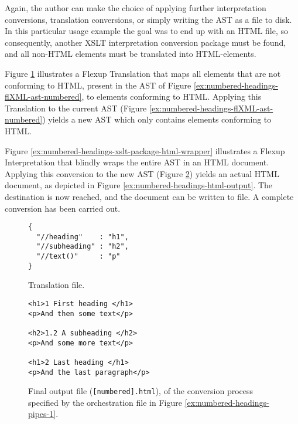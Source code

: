\documentclass{scrreprt}
\begin{document}
Again, the author can make the choice of applying further interpretation conversions, translation conversions, or simply writing the AST as a file to disk. In this particular usage example the goal was to end up with an HTML file, so consequently, another XSLT interpretation conversion package must be found, and all non-HTML elements must be translated into HTML-elements.

Figure \ref{ex:numbered-headings-translation-fupt-html-elements} illustrates a Flexup Translation that maps all elements that are not conforming to HTML, present in the AST of Figure \ref{ex:numbered-headings-flXML-ast-numbered}, to elements conforming to HTML. Applying this Translation to the current AST (Figure \ref{ex:numbered-headings-flXML-ast-numbered}) yields a new AST which only contains elements conforming to HTML.

Figure \ref{ex:numbered-headings-xslt-package-html-wrapper} illustrates a Flexup Interpretation that blindly wraps the entire AST in an HTML document. Applying this conversion to the new AST (Figure \ref{ex:numbered-headings-flXML-ast-numbered-html-fragment}) yields an actual HTML document, as depicted in Figure \ref{ex:numbered-headings-html-output}. The destination is now reached, and the document can be written to file. A complete conversion has been carried out.


\begin{figure}[h]
\begin{lstlisting}
{
  "//heading"    : "h1",
  "//subheading" : "h2",
  "//text()"     : "p"
}
\end{lstlisting}
\caption{Translation file.}
\label{ex:numbered-headings-translation-fupt-html-elements}
\end{figure}



\begin{figure}[h]
\begin{lstlisting}
<h1>1 First heading </h1>
<p>And then some text</p>

<h2>1.2 A subheading </h2>
<p>And some more text</p>

<h1>2 Last heading </h1>
<p>And the last paragraph</p>
\end{lstlisting}
\caption{Final output file (\texttt{[numbered].html}), of the conversion process specified by the orchestration file in Figure \ref{ex:numbered-headings-pipes-1}.}
\label{ex:numbered-headings-flXML-ast-numbered-html-fragment}
\end{figure}
\end{document}

